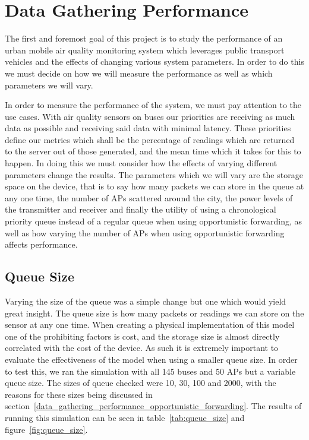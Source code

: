 \chapter{Data Gathering Performance}\label{data_gathering_performance} 


    The first and foremost goal of this project is to study the performance of an urban mobile air quality monitoring system which leverages public transport vehicles and the effects of changing various system parameters. In order to do this we must decide on how we will measure the performance as well as which parameters we will vary. 

    In order to measure the performance of the system, we must pay attention to the use cases. With air quality sensors on buses our priorities are receiving as much data as possible and receiving said data with minimal latency. These priorities define our metrics which shall be the percentage of readings which are returned to the server out of those generated, and the mean time which it takes for this to happen. In doing this we must consider how the effects of varying different parameters change the results. The parameters which we will vary are the storage space on the device, that is to say how many packets we can store in the queue at any one time, the number of APs scattered around the city, the power levels of the transmitter and receiver and finally the utility of using a chronological priority queue instead of a regular queue when using opportunistic forwarding, as well as how varying the number of APs when using opportunistic forwarding affects performance.
	

    \section{Queue Size}\label{data_gathering_performance_queue_size}

        Varying the size of the queue was a simple change but one which would yield great insight. The queue size is how many packets or readings we can store on the sensor at any one time. When creating a physical implementation of this model one of the prohibiting factors is cost, and the storage size is almost directly correlated with the cost of the device. As such it is extremely important to evaluate the effectiveness of the model when using a smaller queue size. In order to test this, we ran the simulation with all 145 buses and 50 APs but a variable queue size. The sizes of queue checked were 10, 30, 100 and 2000, with the reasons for these sizes being discussed in section~\ref{data_gathering_performance_opportunistic_forwarding}. The results of running this simulation can be seen in table~\ref{tab:queue_size} and figure~\ref{fig:queue_size}. 

